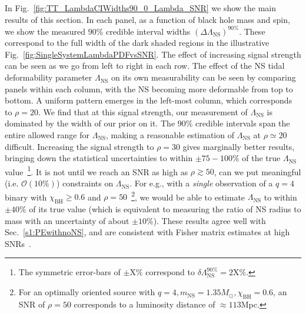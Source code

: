 \documentclass[aps,prd,amsmath,floats,floatfix, twocolumn,
superscriptaddress,nofootinbib,showpacs]{revtex4-1}
\newcommand{\lambdans}{\Lambda_\mathrm{NS}}
\newcommand{\dlambda}{\delta\lambdans^{90\%}}
\newcommand{\chibh}{\chi_\mathrm{BH}}
\newcommand{\mns}{m_\mathrm{NS}}
\begin{document}
In Fig.~\ref{fig:TT_LambdaCIWidths90_0_Lambda_SNR} we show the main results of
this section. In each panel, as a function of black hole mass and spin, we show
the measured $90\%$ credible interval widths $(\Delta\lambdans)^{90\%}$. These
correspond to the full width of the dark shaded regions in the illustrative
Fig.~\ref{fig:SingleSystemLambdaPDFvsSNR}. The effect of increasing signal
strength can be seen as we go from left to right in each row. The effect of the
NS tidal deformability parameter $\lambdans$ on its own measurability can be
seen by comparing panels within each column, with the NS becoming more
deformable from top to bottom. 
%
A uniform pattern emerges in the left-most column, which corresponds to $\rho=20$.
We find that at this signal strength, our measurement of $\lambdans$ is
dominated by the width of our prior on it. The $90\%$ credible intervals span
the entire allowed range for $\lambdans$, making a reasonable estimation of
$\lambdans$ at $\rho\simeq20$ difficult.
% 
Increasing the signal strength to $\rho=30$ gives marginally better results,
bringing down the statistical uncertainties to within $\pm 75-100\%$ of the
true $\lambdans$ value~\footnote{The symmetric error-bars of $\pm\mathrm{X}\%$
correspond to $\dlambda = 2\mathrm{X}\%$.}.
%
It is not until we reach an SNR as high as $\rho\gtrsim 50$, can we put
meaningful (i.e. $\mathcal{O}(10\%)$) constraints on $\lambdans$. For e.g.,
with a {\it single} observation of a $q=4$ binary with $\chibh\geq 0.6$ and
$\rho = 50$~\footnote{For an optimally oriented source with
$q=4, \mns=1.35M_\odot, \chibh=0.6$, an SNR of $\rho = 50$ corresponds to
a luminosity distance of $\approx 113$Mpc.}, we would be able to estimate 
$\lambdans$ to within $\pm 40\%$ of its true value (which is equivalent to
measuring the ratio of NS radius to mass with an uncertainty of about
$\pm 10\%$).
% 
These results agree well with Sec.~\ref{s1:PEwithnoNS}, and are consistent with
Fisher matrix estimates at high SNRs~\cite{Lackey:2013axa}.
\end{document}
